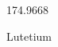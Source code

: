 \documentclass[12pt]{article}
\begin{document}
\hfill{}
\vfill
\begin{center}
  {\fontsize{50}{60}
  }

  174.9668

Lutetium
\end{center}
\vfill
\end{document}
